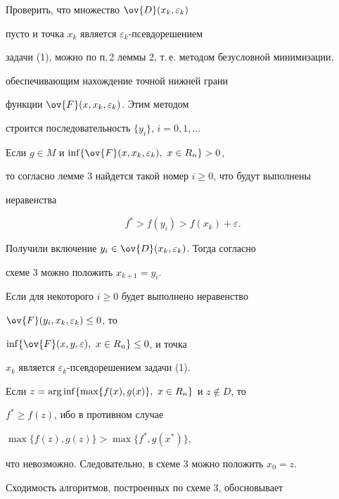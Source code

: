 \begin{note}


Проверить, что множество $\ov{D}(x_k,\varepsilon_k)$


пусто и точка $x_k$ является $\varepsilon_k$-псев\-до\-ре\-ше\-нием


задачи (1), можно по п.\,2 леммы 2, т.\,е. методом безусловной минимизации,


обеспечивающим нахождение точной нижней грани


функции $\ov{F}(x,x_k,\varepsilon_k)$. Этим методом


строится последовательность $\{y_i\}$, $i=0,1,\dotsc$


Если $g\in M$ и $\inf\{\ov{F}(x,x_k,\varepsilon_k),\ x\in R_n\}>0$,


то согласно лемме 3 найдется такой номер $i\ge0$, что будут выполнены


неравенства


$$


f^*>f(y_i)>f(x_k)+\varepsilon.


$$


Получили включение $y_i\in \ov{D}(x_k,\varepsilon_k)$. Тогда согласно


схеме 3 можно положить $x_{k+1}=y_i$.


Если для некоторого $i\ge0$ будет выполнено неравенство


$\ov{F}(y_i,x_k,\varepsilon_k)\le 0$, то


$\inf\{\ov{F}(x,y,\varepsilon),\ x\in R_n\}\le 0$, и точка


$x_k$ является $\varepsilon_k$-псевдорешением задачи (1).


\end{note}





\begin{note}


Если $z=\operatorname{arg\,inf}\{\max\{f(x),g(x)\},\ x\in R_n\}$ и $z\notin D$, то


$f^*\ge f(z)$, ибо в противном случае


$\max\{f(z),g(z)\}>\max\{f^*,g(x^*)\}$,


что невозможно. Следовательно, в схеме 3 можно положить $x_0=z$.


\end{note}





Сходимость алгоритмов, построенных по схеме 3, обосновывает





